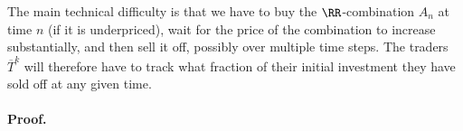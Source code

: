 \documentclass[authordate,onecolumn,noenvironments]{miri-tech-article}
\numberwithin{equation}{subsection}
\newcommand{\seq}[1]{{\overline{#1}}}
\newcommand{\aff}{A}
\newcommand{\trade}{T}%
\newcommand{\Trader}{\seq{\trade}} %
\begin{document}
  The main technical difficulty is that 
we have to buy the $\RR$-combination $\aff_{n}$ at time $n$ (if it is underpriced), wait for the
  price of the combination to increase substantially, and then sell it off, possibly over multiple time steps. 
  The traders $\Trader^k$ will therefore have to track what fraction of their initial investment they have sold off at any given time. 
  


\paragraph{Proof.}
\end{document}

